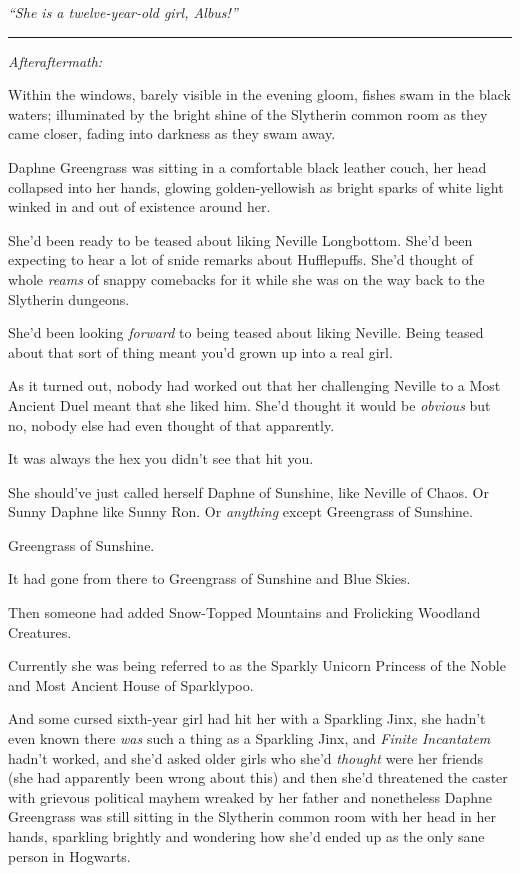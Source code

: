 \emph{``She is a twelve-year-old girl, Albus!''}

\begin{center}\rule{3in}{0.4pt}\end{center}

\emph{Afteraftermath:}

Within the windows, barely visible in the evening gloom, fishes swam in
the black waters; illuminated by the bright shine of the Slytherin
common room as they came closer, fading into darkness as they swam away.

Daphne Greengrass was sitting in a comfortable black leather couch, her
head collapsed into her hands, glowing golden-yellowish as bright sparks
of white light winked in and out of existence around her.

She'd been ready to be teased about liking Neville Longbottom. She'd
been expecting to hear a lot of snide remarks about Hufflepuffs. She'd
thought of whole \emph{reams} of snappy comebacks for it while she was
on the way back to the Slytherin dungeons.

She'd been looking \emph{forward} to being teased about liking Neville.
Being teased about that sort of thing meant you'd grown up into a real
girl.

As it turned out, nobody had worked out that her challenging Neville to
a Most Ancient Duel meant that she liked him. She'd thought it would be
\emph{obvious} but no, nobody else had even thought of that apparently.

It was always the hex you didn't see that hit you.

She should've just called herself Daphne of Sunshine, like Neville of
Chaos. Or Sunny Daphne like Sunny Ron. Or \emph{anything} except
Greengrass of Sunshine.

Greengrass of Sunshine.

It had gone from there to Greengrass of Sunshine and Blue Skies.

Then someone had added Snow-Topped Mountains and Frolicking Woodland
Creatures.

Currently she was being referred to as the Sparkly Unicorn Princess of
the Noble and Most Ancient House of Sparklypoo.

And some cursed sixth-year girl had hit her with a Sparkling Jinx, she
hadn't even known there \emph{was} such a thing as a Sparkling Jinx, and
\emph{Finite Incantatem} hadn't worked, and she'd asked older girls who
she'd \emph{thought} were her friends (she had apparently been wrong
about this) and then she'd threatened the caster with grievous political
mayhem wreaked by her father and nonetheless Daphne Greengrass was still
sitting in the Slytherin common room with her head in her hands,
sparkling brightly and wondering how she'd ended up as the only sane
person in Hogwarts.

